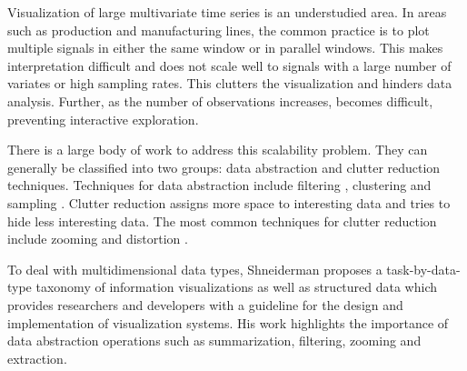 
Visualization of large multivariate time series is an understudied area. In areas such as production and manufacturing lines, the common practice is to plot multiple signals in either the same window or in parallel windows. This makes interpretation difficult and does not scale well to signals with a large number of variates or high sampling rates. %
This clutters the visualization and hinders data analysis. Further, as the number of observations increases,  becomes difficult, preventing interactive exploration.

There is a large body of work to address this scalability problem.
They can generally be classified into two groups: data abstraction and clutter reduction 
techniques. Techniques for data abstraction include filtering \cite{conf/chi/AhlbergS94b}, clustering
and sampling \cite{553159}. Clutter reduction assigns more space to interesting data and tries to hide less interesting data.
The most common techniques for clutter reduction include zooming and distortion \cite{559215,1382895,1196005}.
%
%

To deal with multidimensional data types, Shneiderman \cite{545307} proposes a task-by-data-type taxonomy of information visualizations as well as structured data which provides researchers and developers with a guideline for
the design and implementation of visualization systems. His work highlights the importance of data
abstraction operations such as summarization, filtering, zooming and extraction.
%

